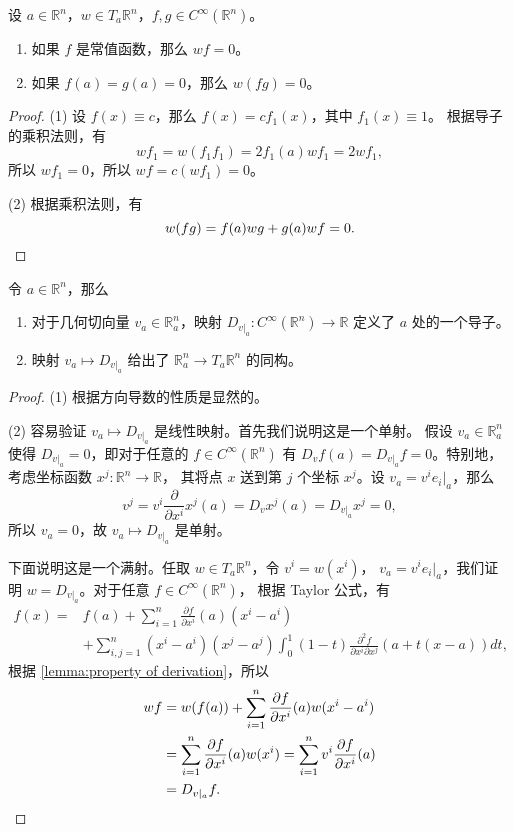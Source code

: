 \documentclass[fontset=none]{Notes}
\begin{document}
\begin{lemma}[导子的性质]\label{lemma:property of derivation}
  设 $a\in\mathbb{R}^n$，$w\in T_a\mathbb{R}^n$，$f,g\in C^\infty(\mathbb{R}^n)$。
  \begin{enumerate}
    \item 如果 $f$ 是常值函数，那么 $wf=0$。
    \item 如果 $f(a)=g(a)=0$，那么 $w(fg)=0$。
  \end{enumerate}
\end{lemma}
\begin{proof}
  (1) 设 $f(x)\equiv c$，那么 $f(x)=cf_1(x)$，其中 $f_1(x)\equiv 1$。
  根据导子的乘积法则，有
  \[
    wf_1=w(f_1f_1)=2f_1(a)wf_1=2wf_1,
  \]
  所以 $wf_1=0$，所以 $wf=c(wf_1)=0$。

  (2) 根据乘积法则，有
  \[
    w(fg)=f(a)wg+g(a)wf=0.\qedhere  
  \]
\end{proof}

\begin{proposition}\label{prop:gemotry tangent vector is derivation}
  令 $a\in\mathbb{R}^n$，那么
  \begin{enumerate}
    \item 对于几何切向量 $v_a\in \mathbb{R}_a^n$，映射 $D_{v|_a}:C^\infty(\mathbb{R}^n)\to\mathbb{R}$
    定义了 $a$ 处的一个导子。
    \item 映射 $v_a\mapsto D_{v|_a}$ 给出了 $\mathbb{R}_a^n\to T_a\mathbb{R}^n$ 的同构。
  \end{enumerate}
\end{proposition}
\begin{proof}
  (1) 根据方向导数的性质是显然的。

  (2) 容易验证 $v_a\mapsto D_{v|_a}$ 是线性映射。首先我们说明这是一个单射。
  假设 $v_a\in\mathbb{R}_a^n$ 使得 $D_{v|_a}=0$，即对于任意的 $f\in C^\infty(\mathbb{R}^n)$
  有 $D_vf(a)=D_{v|_a}f=0$。特别地，考虑坐标函数 $x^j:\mathbb{R}^n\to\mathbb{R}$，
  其将点 $x$ 送到第 $j$ 个坐标 $x^j$。设 $v_a=v^i e_i|_a$，那么
  \[
    v^j=v^i\frac{\partial}{\partial x^i}x^j(a)=D_v x^j(a)=D_{v|_a}x^j=  0,
  \]
  所以 $v_a=0$，故 $v_a\mapsto D_{v|_a}$ 是单射。

  下面说明这是一个满射。任取 $w\in T_a\mathbb{R}^n$，令 $v^i=w(x^i)$，
  $v_a=v^ie_i|_a$，我们证明 $w=D_{v|_a}$。对于任意 $f\in C^\infty(\mathbb{R}^n)$，
  根据 Taylor 公式，有
  \begin{align*}
    f(x)={}&f(a)+\sum_{i=1}^n\frac{\partial f}{\partial x^i}(a)(x^i-a^i)\\
    &+\sum_{i,j=1}^n(x^i-a^i)(x^j-a^j)\int_0^1(1-t)\frac{\partial^2 f}{\partial x^i\partial x^j}
    (a+t(x-a))dt,
  \end{align*}
  根据 \autoref{lemma:property of derivation}，所以
  \begin{align*}
    wf&=w(f(a))+\sum_{i=1}^n\frac{\partial f}{\partial x^i}(a)w(x^i-a^i)\\
    &=\sum_{i=1}^n\frac{\partial f}{\partial x^i}(a)w(x^i)=\sum_{i=1}^nv^i
    \frac{\partial f}{\partial x^i}(a)\\
    &=D_{v|_a}f.\qedhere
  \end{align*}
\end{proof}
\end{document}
